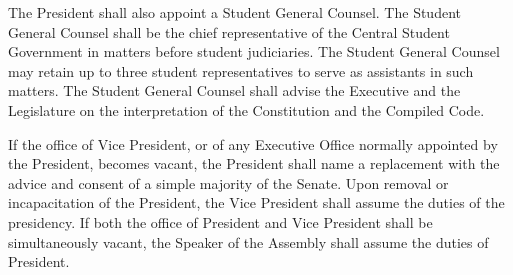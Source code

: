     The President shall also appoint a Student General Counsel. The Student General Counsel shall be the chief representative of the Central Student Government in matters before student judiciaries. The Student General Counsel may retain up to three student representatives to serve as assistants in such matters. The Student General Counsel shall advise the Executive and the Legislature on the interpretation of the Constitution and the Compiled Code.


    If the office of Vice President, or of any Executive Office normally appointed by the President, becomes vacant, the President shall name a replacement with the advice and consent of a simple majority of the Senate. Upon removal or incapacitation of the President, the Vice President shall assume the duties of the presidency. If both the office of President and Vice President shall be simultaneously vacant, the Speaker of the Assembly shall assume the duties of President.
